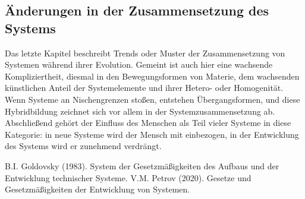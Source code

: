\documentclass[a4paper,11pt]{article}
\begin{document}
\subsection{Änderungen in der Zusammensetzung des Systems}

Das letzte Kapitel beschreibt Trends oder Muster der Zusammensetzung von
Systemen wäh\-rend ihrer Evolution. Gemeint ist auch hier eine wachsende
Kompliziertheit, diesmal in den Bewegungsformen von Materie, dem wachsenden
künstlichen Anteil der Systemelemente und ihrer Hetero- oder Homogenität. Wenn
Systeme an Nischengrenzen stoßen, entstehen Übergangsformen, und diese
Hybridbildung zeichnet sich vor allem in der Systemzusammensetzung ab.
Abschließend gehört der Einfluss des Menschen als Teil vieler Systeme in diese
Kategorie: in neue Systeme wird der Mensch mit einbezogen, in der Entwicklung
des Systems wird er zunehmend verdrängt.


\begin{thebibliography}{xx}
 B.I. Goldovsky (1983). System der Gesetzmäßigkeiten
  des Aufbaus und der Entwicklung technischer Systeme.
 V.M. Petrov (2020). Gesetze und Gesetzmäßigkeiten der
  Entwicklung von Systemen.
\end{thebibliography}
\end{document}
